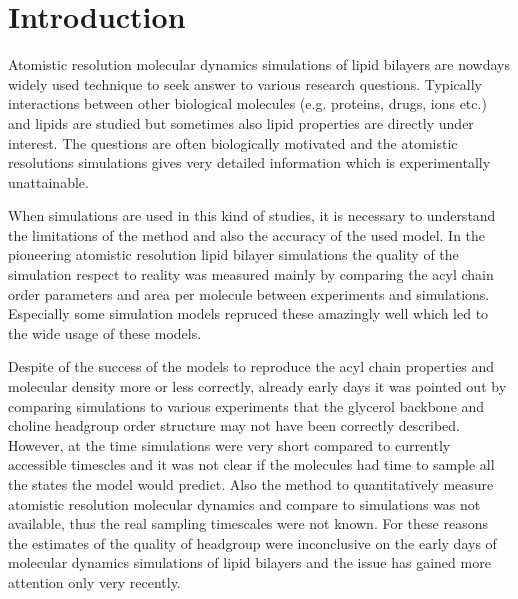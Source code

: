 \documentclass[aps,prl,superscriptaddress,twocolumn]{revtex4}
\begin{document}

\maketitle %



\section{Introduction}
Atomistic resolution molecular dynamics simulations of lipid bilayers are nowdays
widely used technique to seek answer to various research questions.
Typically interactions between other biological molecules (e.g. proteins, drugs, ions etc.)
and lipids are studied but sometimes also lipid properties are directly under interest.
The questions are often biologically motivated and the atomistic resolutions simulations
gives very detailed information which is experimentally unattainable.

When simulations are used in this kind of studies, it is necessary to understand
the limitations of the method and also the accuracy of the used model.
In the pioneering atomistic resolution lipid bilayer simulations the quality of
the simulation respect to reality was measured mainly by comparing the 
acyl chain order parameters and area per molecule between experiments and
simulations. Especially some simulation models repruced these amazingly well
which led to the wide usage of these models.

Despite of the success of the models to reproduce the acyl chain properties and
molecular density more or less correctly, already early days it was pointed out
by comparing simulations to various experiments
that the glycerol backbone and choline headgroup order structure may not have been 
correctly described. However, at the time simulations were very short compared
to currently accessible timescles and it was not clear if the molecules had
time to sample all the states the model would predict. Also the method to 
quantitatively measure atomistic resolution molecular dynamics and compare to
simulations was not available, thus the real sampling timescales were not known.
For these reasons the estimates of the quality of headgroup were inconclusive on
the early days of molecular dynamics simulations of lipid bilayers and
the issue has gained more attention only very recently.
\end{document}
